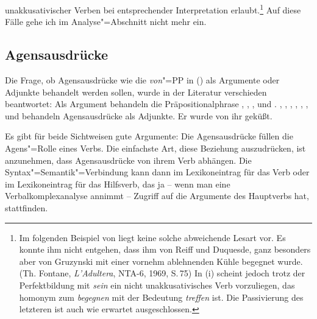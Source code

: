 unakkusativischer Verben bei entsprechender Interpretation erlaubt.\footnote{
        Im folgenden Beispiel von \citet[]{Faucher87}
        liegt keine solche abweichende Lesart vor.
        \ea
        Es konnte ihm nicht entgehen, dass ihm von Reiff und Duquesde,
        ganz besonders aber von Gruzynski mit einer vornehm
        ablehnenden Kühle begegnet wurde. (Th. Fontane, {\em L'Adultera},
        NTA-6, 1969, S.\,75)
        \z
        In (i) scheint jedoch trotz der Perfektbildung mit \emph{sein}
        ein nicht unakkusativisches Verb vorzuliegen, das homonym zum \emph{begegnen}
        mit der Bedeutung \emph{treffen} ist. Die Passivierung des letzteren
        ist auch wie erwartet ausgeschlossen.
        \eal
        \zllast
}
Auf  diese Fälle gehe ich im Analyse"=Abschnitt nicht mehr ein.


\subsection{Agensausdrücke}

Die Frage, ob Agensausdrücke wie die \emph{von}"=PP in () als Argumente oder Adjunkte behandelt werden sollen,
wurde in der Literatur verschieden beantwortet: Als Argument behandeln 
die Präpositionalphrase \zb 
\citet[]{Heringer73a}, 
\citet{Bresnan82a},
\citet{ps}, 
\citet{MS98a} und
\citet[Kapitel~15.3]{Mueller99a}.
%
\citet[]{Hoehle78a}, \citet{Sadzinski87a}, \citet[]{Stechow90a}, 
\citet[]{Zifonun92a}, 
\citet[]{Lieb92a},
\citet[]{Wunderlich93a}, 
\citet{Mueller2003e} und 
\citet[]{Gunkel2003b} 
behandeln Agensausdrücke als Adjunkte.
\ea
Er wurde von ihr geküßt.
\z

\noindent
Es gibt für beide Sichtweisen gute Argumente: Die Agensausdrücke füllen die Agens"=Rolle
eines Verbs. Die einfachste Art, diese Beziehung auszudrücken, ist anzunehmen, dass Agensausdrücke
von ihrem Verb abhängen. Die Syntax"=Semantik"=Verbindung kann dann im Lexikoneintrag für das
Verb oder im Lexikoneintrag für das Hilfsverb, das ja -- wenn man eine Verbalkomplexanalyse annimmt --
Zugriff auf die Argumente des Hauptverbs hat, stattfinden.

